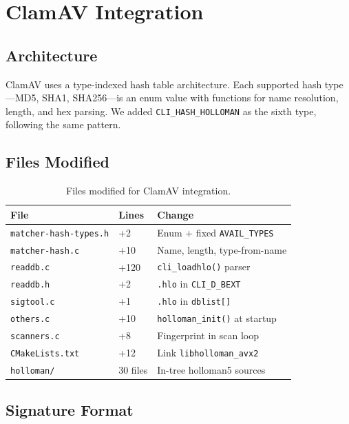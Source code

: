 \documentclass[11pt,a4paper]{article}
\begin{document}
\section{ClamAV Integration}

\subsection{Architecture}

ClamAV uses a type-indexed hash table architecture.  Each supported hash
type---MD5, SHA1, SHA256---is an enum value with functions for name
resolution, length, and hex parsing.  We added \texttt{CLI\_HASH\_HOLLOMAN}
as the sixth type, following the same pattern.

\subsection{Files Modified}

\begin{table}[h]
\centering
\begin{tabular}{lll}
\toprule
File & Lines & Change \\
\midrule
\texttt{matcher-hash-types.h} & +2 & Enum + fixed \texttt{AVAIL\_TYPES} \\
\texttt{matcher-hash.c} & +10 & Name, length, type-from-name \\
\texttt{readdb.c} & +120 & \texttt{cli\_loadhlo()} parser \\
\texttt{readdb.h} & +2 & \texttt{.hlo} in \texttt{CLI\_D\_BEXT} \\
\texttt{sigtool.c} & +1 & \texttt{.hlo} in \texttt{dblist[]} \\
\texttt{others.c} & +10 & \texttt{holloman\_init()} at startup \\
\texttt{scanners.c} & +8 & Fingerprint in scan loop \\
\texttt{CMakeLists.txt} & +12 & Link \texttt{libholloman\_avx2} \\
\texttt{holloman/} & 30 files & In-tree holloman5 sources \\
\bottomrule
\end{tabular}
\caption{Files modified for ClamAV integration.}
\label{tab:clamav-files}
\end{table}

\subsection{Signature Format}
\end{document}
